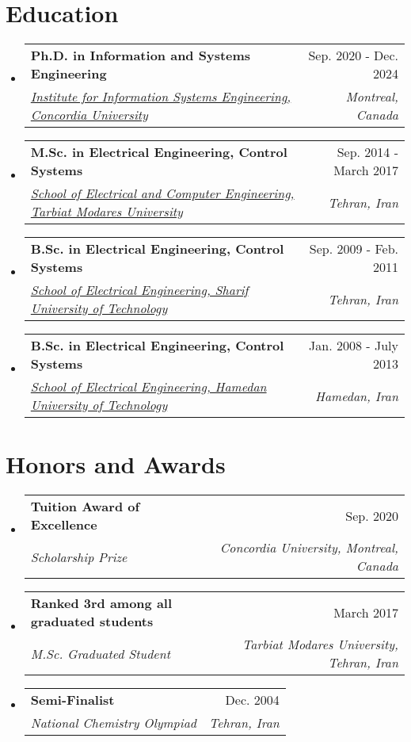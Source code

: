 \documentclass[letterpaper,10.8pt]{article}
\makeatletter
\newcommand{\resumeSubheading}[4]{
  \vspace{-1pt}\item
    \begin{tabular*}{0.97\textwidth}{l@{\extracolsep{\fill}}r}
      \textbf{#1} & #2 \\
      \textit{\small#3} & \textit{\small #4} \\
    \end{tabular*}\vspace{-5pt}
}
\newcommand{\resumeSubHeadingListStart}{\begin{itemize}[leftmargin=*]}
\newcommand{\resumeSubHeadingListEnd}{\end{itemize}}
\makeatother
\begin{document}
\section{Education}
  \resumeSubHeadingListStart
    \resumeSubheading
      {Ph.D. in Information and Systems Engineering}{Sep. 2020 - Dec. 2024}
      {\href{https://www.concordia.ca/ginacody/info-systems-eng.html}{Institute for Information Systems Engineering, Concordia University}}{Montreal, Canada}
      
	    
    \resumeSubheading
      {M.Sc. in Electrical Engineering, Control Systems}{Sep. 2014 - March 2017}
      {\href{https://en-ece.modares.ac.ir/}{School of Electrical and Computer Engineering, Tarbiat Modares University}}{Tehran, Iran}
      
      \resumeSubheading
      {B.Sc. in Electrical Engineering, Control Systems}{Sep. 2009 - Feb. 2011}
      {\href{https://www.ee.sharif.ir/en/home}{School of Electrical Engineering, Sharif University of Technology}}{Tehran, Iran}
      
      \resumeSubheading
      {B.Sc. in Electrical Engineering, Control Systems}{Jan. 2008 - July 2013}
      {\href{https://en.hut.ac.ir/electrical-engineering}{School of Electrical Engineering, Hamedan University of Technology}}{Hamedan, Iran}
      
  \resumeSubHeadingListEnd

%
\section{Honors and Awards}
  \resumeSubHeadingListStart
      \resumeSubheading
      {Tuition Award of Excellence}{Sep. 2020}
      {Scholarship Prize}{Concordia University, Montreal, Canada}
      
      
    \resumeSubheading
      {Ranked 3rd among all graduated students}{March 2017}
      {M.Sc. Graduated Student}{Tarbiat Modares University, Tehran, Iran}


    \resumeSubheading
      {Semi-Finalist}{Dec. 2004}
      {National Chemistry Olympiad}{Tehran, Iran}
      
\resumeSubHeadingListEnd
\end{document}
